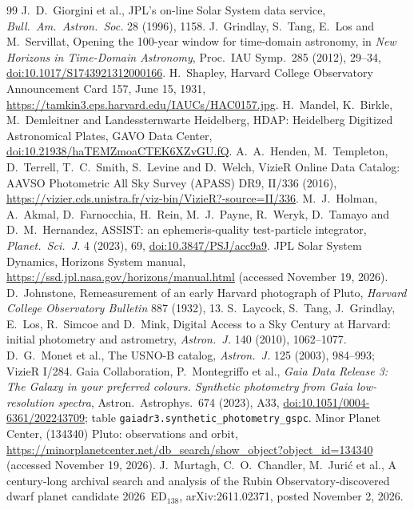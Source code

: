 \documentclass[11pt]{article}
\begin{document}
\begin{thebibliography}{99}
 J.~D.~Giorgini et al., JPL's on-line Solar System data service, \emph{Bull.\ Am.\ Astron.\ Soc.} 28 (1996), 1158.
 J.~Grindlay, S.~Tang, E.~Los and M.~Servillat, Opening the 100-year window for time-domain astronomy, in \emph{New Horizons in Time-Domain Astronomy}, Proc.\ IAU Symp.\ 285 (2012), 29--34, \href{https://doi.org/10.1017/S1743921312000166}{doi:10.1017/S1743921312000166}.
 H.~Shapley, Harvard College Observatory Announcement Card 157, June 15, 1931, \url{https://tamkin3.eps.harvard.edu/IAUCs/HAC0157.jpg}.
 H.~Mandel, K.~Birkle, M.~Demleitner and Landessternwarte Heidelberg, HDAP: Heidelberg Digitized Astronomical Plates, GAVO Data Center, \href{https://doi.org/10.21938/haTEMZmoaCTEK6XZvGU.fQ}{doi:10.21938/haTEMZmoaCTEK6XZvGU.fQ}.
 A.~A.~Henden, M.~Templeton, D.~Terrell, T.~C.~Smith, S.~Levine and D.~Welch, VizieR Online Data Catalog: AAVSO Photometric All Sky Survey (APASS) DR9, II/336 (2016), \url{https://vizier.cds.unistra.fr/viz-bin/VizieR?-source=II/336}.
 M.~J.~Holman, A.~Akmal, D.~Farnocchia, H.~Rein, M.~J.~Payne, R.~Weryk, D.~Tamayo and D.~M.~Hernandez, ASSIST: an ephemeris-quality test-particle integrator, \emph{Planet.\ Sci.\ J.} 4 (2023), 69, \href{https://doi.org/10.3847/PSJ/acc9a9}{doi:10.3847/PSJ/acc9a9}.
 JPL Solar System Dynamics, Horizons System manual, \url{https://ssd.jpl.nasa.gov/horizons/manual.html} (accessed November 19, 2026).
 D.~Johnstone, Remeasurement of an early Harvard photograph of Pluto, \emph{Harvard College Observatory Bulletin} 887 (1932), 13.
 S.~Laycock, S.~Tang, J.~Grindlay, E.~Los, R.~Simcoe and D.~Mink, Digital Access to a Sky Century at Harvard: initial photometry and astrometry, \emph{Astron.\ J.} 140 (2010), 1062--1077.
 D.~G.~Monet et al., The USNO-B catalog, \emph{Astron.\ J.} 125 (2003), 984--993; VizieR I/284.
 Gaia Collaboration, P.~Montegriffo et al., \emph{Gaia Data Release 3: The Galaxy in your preferred colours. Synthetic photometry from Gaia low-resolution spectra}, Astron.\ Astrophys.\ 674 (2023), A33, \href{https://doi.org/10.1051/0004-6361/202243709}{doi:10.1051/0004-6361/202243709}; table \texttt{gaiadr3.synthetic\_photometry\_gspc}.
 Minor Planet Center, (134340) Pluto: observations and orbit, \url{https://minorplanetcenter.net/db_search/show_object?object_id=134340} (accessed November 19, 2026).
 J.~Murtagh, C.~O.~Chandler, M.~Jurić et al., A century-long archival search and analysis of the Rubin Observatory-discovered dwarf planet candidate 2026~ED$_{138}$, arXiv:2611.02371, posted November 2, 2026.

\end{thebibliography}
\end{document}
